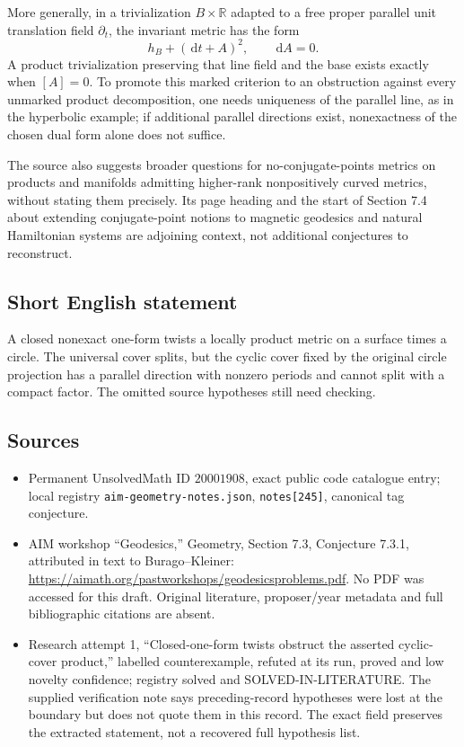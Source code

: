 \documentclass[11pt]{article}
\newcommand{\R}{\mathbb{R}}
\newcommand{\dd}{\,\mathrm{d}}
\begin{document}
More generally, in a trivialization \(B\times\R\) adapted to a free proper parallel unit translation field \(\partial_t\), the invariant metric has the form
\[
 h_B+(\dd t+A)^2,\qquad \dd A=0.
\]
A product trivialization preserving that line field and the base exists exactly when \([A]=0\). To promote this marked criterion to an obstruction against every unmarked product decomposition, one needs uniqueness of the parallel line, as in the hyperbolic example; if additional parallel directions exist, nonexactness of the chosen dual form alone does not suffice.

The source also suggests broader questions for no-conjugate-points metrics on products and manifolds admitting higher-rank nonpositively curved metrics, without stating them precisely. Its page heading and the start of Section 7.4 about extending conjugate-point notions to magnetic geodesics and natural Hamiltonian systems are adjoining context, not additional conjectures to reconstruct.
\subsection{Short English statement}
A closed nonexact one-form twists a locally product metric on a surface times a circle. The universal cover splits, but the cyclic cover fixed by the original circle projection has a parallel direction with nonzero periods and cannot split with a compact factor. The omitted source hypotheses still need checking.
\subsection{Sources}
\begin{itemize}
\item Permanent UnsolvedMath ID \(20001908\), exact public code catalogue entry; local registry \texttt{aim-geometry-notes.json}, \texttt{notes[245]}, canonical tag conjecture.
\item AIM workshop ``Geodesics,'' Geometry, Section 7.3, Conjecture 7.3.1, attributed in text to Burago--Kleiner: \url{https://aimath.org/pastworkshops/geodesicsproblems.pdf}. No PDF was accessed for this draft. Original literature, proposer/year metadata and full bibliographic citations are absent.
\item Research attempt 1, ``Closed-one-form twists obstruct the asserted cyclic-cover product,'' labelled counterexample, refuted at its run, proved and low novelty confidence; registry solved and SOLVED-IN-LITERATURE. The supplied verification note says preceding-record hypotheses were lost at the boundary but does not quote them in this record. The exact field preserves the extracted statement, not a recovered full hypothesis list.
\end{itemize}
\end{document}
